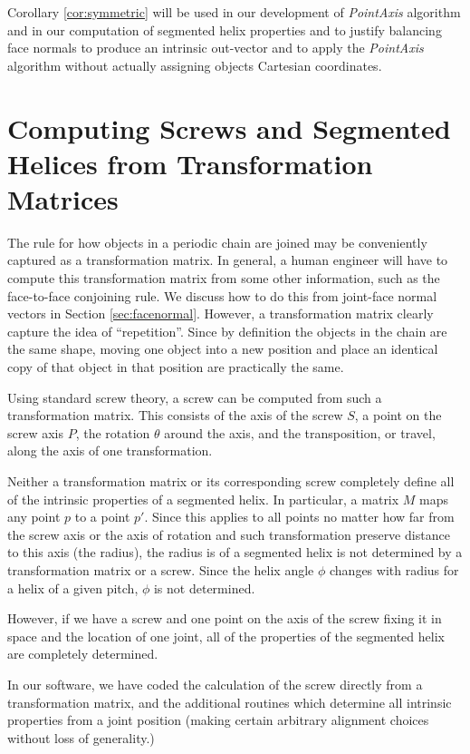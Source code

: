\documentclass[11pt]{article}
\begin{document}
{Corollary \ref{cor:symmetric} will be used in our development of {\em PointAxis} algorithm
and in our computation of segmented helix properties and to justify balancing face normals
to produce an intrinsic out-vector and to apply the {\em PointAxis} algorithm
without actually assigning objects Cartesian coordinates.

\section{Computing Screws and Segmented Helices from Transformation Matrices}

The rule for how objects in a periodic chain are joined may be conveniently captured as a transformation
matrix. In general, a human engineer will have to compute this transformation matrix from some other
information, such as the face-to-face conjoining rule. We discuss how to do this from joint-face normal
vectors in Section \ref{sec:facenormal}. However, a transformation matrix clearly
capture the idea of ``repetition''. Since by definition the objects in the chain are the same shape,
moving one object into a new position and place an identical copy of that object in that position
are practically the same.

Using standard screw theory\cite{wittenburg2016kinematics,wiki:screwaxis}, a screw can be computed from such
a transformation matrix. This consists of the axis of the screw $S$, a point on the screw axis $P$,
the rotation $\theta$ around the axis, and the
transposition, or travel, along the axis of one transformation.

Neither a transformation matrix or its corresponding screw
completely define all of the intrinsic
properties of a segmented helix. In particular, a matrix $M$ maps any point $p$ to a point $p'$.
Since this applies to all points no matter how far from the screw axis or the axis of rotation and
such transformation preserve distance to this axis (the radius), the radius is of a segmented helix
is not determined by a transformation matrix or a screw. Since the helix angle $\phi$ changes
with radius for a helix of a given pitch, $\phi$ is not determined.

However, if we have a screw and one point on the axis of the screw fixing it in space
and the location of one joint, all of the properties of the segmented helix are completely determined.

In our software, we have coded the calculation of the screw directly from a transformation matrix, and
the additional routines which determine all intrinsic properties from a joint position (making
certain arbitrary alignment choices without loss of generality.)

}
\end{document}
